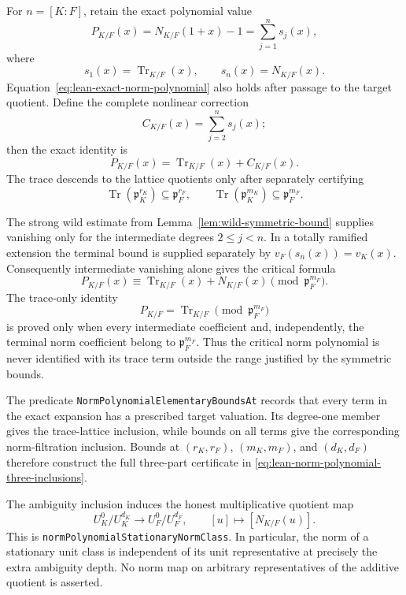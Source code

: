 \begin{definition}
For $n=[K:F]$, retain the exact polynomial value
\begin{equation}\label{eq:lean-exact-norm-polynomial}
 P_{K/F}(x)=N_{K/F}(1+x)-1
           =\sum_{j=1}^{n}s_j(x),
\end{equation}
where
\[
 s_1(x)=\operatorname{Tr}_{K/F}(x),
 \qquad s_n(x)=N_{K/F}(x).
\]
Equation~\ref{eq:lean-exact-norm-polynomial} also holds after passage to
the target quotient.  Define the complete nonlinear correction
\[
 C_{K/F}(x)=\sum_{j=2}^{n}s_j(x);
\]
then the exact identity is
\[
 P_{K/F}(x)=\operatorname{Tr}_{K/F}(x)+C_{K/F}(x).
\]
The trace descends to the lattice quotients only after separately
certifying
\[
 \operatorname{Tr}(\mathfrak p_K^{r_K})
   \subseteq\mathfrak p_F^{r_F},
 \qquad
 \operatorname{Tr}(\mathfrak p_K^{m_K})
   \subseteq\mathfrak p_F^{m_F}.
\]

The strong wild estimate from
Lemma~\ref{lem:wild-symmetric-bound} supplies vanishing only for the
intermediate degrees $2\leq j<n$.  In a totally ramified extension the
terminal bound is supplied separately by
$v_F(s_n(x))=v_K(x)$.  Consequently intermediate vanishing alone gives
the critical formula
\[
 P_{K/F}(x)\equiv
 \operatorname{Tr}_{K/F}(x)+N_{K/F}(x)
 \pmod{\mathfrak p_F^{m_F}}.
\]
The trace-only identity
\[
 P_{K/F}=\operatorname{Tr}_{K/F}
 \pmod{\mathfrak p_F^{m_F}}
\]
is proved only when every intermediate coefficient and, independently,
the terminal norm coefficient belong to $\mathfrak p_F^{m_F}$.  Thus the
critical norm polynomial is never identified with its trace term outside
the range justified by the symmetric bounds.

The predicate \texttt{NormPolynomialElementaryBoundsAt} records that
every term in the exact expansion has a prescribed target valuation.
Its degree-one member gives the trace-lattice inclusion, while bounds on
all terms give the corresponding norm-filtration inclusion.  Bounds at
$(r_K,r_F)$, $(m_K,m_F)$, and $(d_K,d_F)$ therefore construct the full
three-part certificate in
\eqref{eq:lean-norm-polynomial-three-inclusions}.

The ambiguity inclusion induces the honest multiplicative quotient map
\[
 U_K^0/U_K^{d_K}\longrightarrow U_F^0/U_F^{d_F},
 \qquad [u]\longmapsto[N_{K/F}(u)].
\]
This is \texttt{normPolynomialStationaryNormClass}.  In particular, the
norm of a stationary unit class is independent of its unit representative
at precisely the extra ambiguity depth.  No norm map on arbitrary
representatives of the additive quotient is asserted.


\end{definition}
